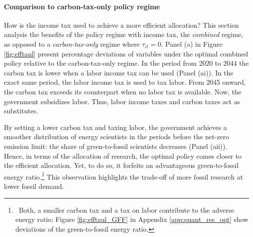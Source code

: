 \begin{figure}[h!!!]
\begin{subfigure}[]{1\textwidth}
\begin{subfigure}[]{0.4\textwidth}
	\end{subfigure}	
\end{subfigure}
\end{figure} 


\paragraph{Comparison to carbon-tax-only policy regime}
How is the income tax used to achieve a more efficient allocation?
This section analysis the benefits of the policy regime with income tax, the \textit{combined} regime, as opposed to a \textit{carbon-tax-only} regime where $\tau_{\iota t}=0$.  
Panel (a)  in Figure \ref{fig:efftaul} present percentage deviations of variables under the optimal combined policy relative to the carbon-tax-only regime. In the period from 2020 to 2044 the carbon tax is lower when a labor income tax can be used (Panel (ai)). In the exact same period, the labor income tax is used to tax labor. From 2045 onward, the carbon tax exceeds its counterpart when no labor tax is available. Now, the government subsidizes labor. Thus, labor income taxes and carbon taxes act as substitutes.

By setting a lower carbon tax and taxing labor, the government achieves a smoother distribution of energy scientists in the periods before the net-zero emission limit: the share of green-to-fossil scientists decreases (Panel (aii)). 
Hence, in terms of the allocation of research, the optimal policy comes closer to the efficient allocation. Yet, to do so, it forfeits an advantageous green-to-fossil energy ratio.\footnote{ \ Both, a smaller carbon tax and a tax on labor contribute to the adverse energy ratio; Figure \ref{fig:efftaul_GFF} in Appendix \ref{app:quant_res_opt} show deviations of the green-to-fossil energy ratio.} This observation highlights the trade-off of more fossil research at lower fossil demand. 

